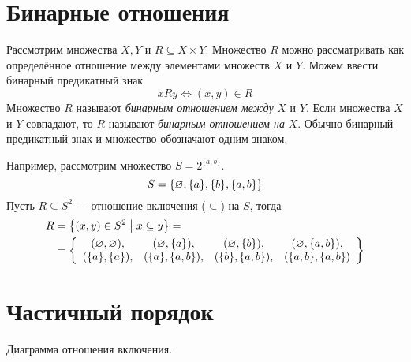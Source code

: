 \section{Бинарные отношения}

Рассмотрим множества $X,Y$ и $R\subseteq X\times Y$. Множество $R$ можно рассматривать
как определённое отношение между элементами множеств $X$ и $Y$. Можем ввести бинарный
предикатный знак
\[
  xRy\iff (x,y)\in R
\]
Множество $R$ называют {\it бинарным отношением между}
$X$ и $Y$. Если множества $X$ и $Y$
совпадают, то $R$ называют {\it бинарным отношением на} $X$.
Обычно бинарный предикатный знак и множество обозначают одним знаком.

Например, рассмотрим множество $S=2^{\{a,b\}}$.
\[
  S=\{\varnothing,\{a\},\{b\},\{a,b\}\}
\]
Пусть $R\subseteq S^{2}$ --- отношение включения ($\subseteq$) на $S$, тогда
\[
  \begin{aligned}
    R
     & =\left\{(x,y)\in S^{2}\;\big|\; x\subseteq y\right\}= \\
     & =\left\{
    \begin{array}{cccc}
      (\varnothing,\varnothing), & (\varnothing,\{a\}),   & (\varnothing,\{b\}),   & (\varnothing,\{a,b\}),  \\
      (\{a\},\{a\}), & (\{a\},\{a,b\}), & (\{b\},\{a,b\}), & (\{a,b\},\{a,b\})
    \end{array}\right\}
  \end{aligned}
\]

\pagebreak

\section{Частичный порядок}

\begin{marginfigure}[1cm]
  \center

  \caption{Диаграмма отношения включения.}\label{fig:inc_diag}
\end{marginfigure}

